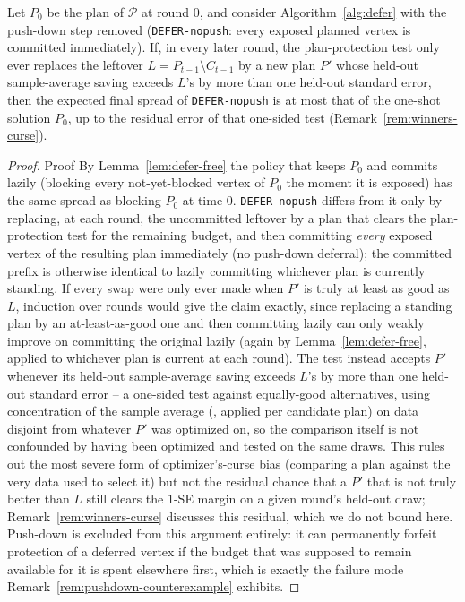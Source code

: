 \documentclass[ijoc,sglanonrev]{informs4}
\begin{document}
\begin{repeattheorem}
Let $P_0$ be the plan of $\mathcal P$ at round $0$, and consider
Algorithm~\ref{alg:defer} with the push-down step removed
(\texttt{DEFER-nopush}: every exposed planned vertex is committed
immediately). If, in every later round, the plan-protection test only ever
replaces the leftover $L=P_{t-1}\setminus C_{t-1}$ by a new plan $P'$
whose held-out sample-average saving exceeds $L$'s by more than one
held-out standard error, then the expected final spread of
\texttt{DEFER-nopush} is at most that of the one-shot solution $P_0$, up to
the residual error of that one-sided test (Remark~\ref{rem:winners-curse}).
\end{repeattheorem}
\begin{proof}{Proof}
By Lemma~\ref{lem:defer-free} the policy that keeps $P_0$ and commits
lazily (blocking every not-yet-blocked vertex of $P_0$ the moment it is
exposed) has the same spread as blocking $P_0$ at time $0$.
\texttt{DEFER-nopush} differs from it only by replacing, at each round,
the uncommitted leftover by a plan that clears the plan-protection test
for the remaining budget, and then committing \emph{every} exposed vertex
of the resulting plan immediately (no push-down deferral); the committed
prefix is otherwise identical to lazily committing whichever plan is
currently standing. If every swap were only ever made when $P'$ is truly
at least as good as $L$, induction over rounds would give the claim
exactly, since replacing a standing plan by an at-least-as-good one and
then committing lazily can only weakly improve on committing the original
lazily (again by Lemma~\ref{lem:defer-free}, applied to whichever plan is
current at each round). The test instead accepts $P'$ whenever its
held-out sample-average saving exceeds $L$'s by more than one held-out
standard error -- a one-sided test against equally-good alternatives,
using concentration of the sample average (\citealp{xie2024}, applied per
candidate plan) on data disjoint from whatever $P'$ was optimized on, so
the comparison itself is not confounded by having been optimized and
tested on the same draws. This rules out the most severe form of
optimizer's-curse bias (comparing a plan against the very data used to
select it) but not the residual chance that a $P'$ that is not truly
better than $L$ still clears the $1$-SE margin on a given round's held-out
draw; Remark~\ref{rem:winners-curse} discusses this residual, which we do
not bound here. Push-down is excluded from this argument entirely: it can
permanently forfeit protection of a deferred vertex if the budget that was
supposed to remain available for it is spent elsewhere first, which is
exactly the failure mode Remark~\ref{rem:pushdown-counterexample}
exhibits.\Halmos
\end{proof}
\end{document}
